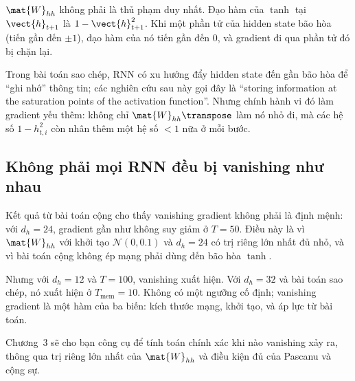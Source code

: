 $\mat{W}_{hh}$ không phải là thủ phạm duy nhất. Đạo hàm của $\tanh$ tại
$\vect{h}_{t+1}$ là $1 - \vect{h}_{t+1}^2$. Khi một phần tử của hidden
state bão hòa (tiến gần đến $\pm 1$), đạo hàm của nó tiến gần đến 0, và
gradient đi qua phần tử đó bị chặn lại.

Trong bài toán sao chép, RNN có xu hướng đẩy hidden state đến gần bão hòa
để ``ghi nhớ'' thông tin; các nghiên cứu sau này gọi đây là \enquote{storing
information at the saturation points of the activation function}. Nhưng chính
hành vi đó làm gradient yếu thêm: không chỉ $\mat{W}_{hh}\transpose$ làm nó
nhỏ đi, mà các hệ số $1 - h_{t,i}^2$ còn nhân thêm một hệ số $< 1$ nữa ở mỗi
bước.

\subsection{Không phải mọi RNN đều bị vanishing như nhau}

Kết quả từ bài toán cộng cho thấy vanishing gradient không phải là định mệnh:
với $d_h = 24$, gradient gần như không suy giảm ở $T = 50$. Điều này là vì
$\mat{W}_{hh}$ với khởi tạo $\mathcal{N}(0, 0.1)$ và $d_h = 24$ có trị riêng
lớn nhất đủ nhỏ, và vì bài toán cộng không ép mạng phải dùng đến bão hòa
$\tanh$.

Nhưng với $d_h = 12$ và $T = 100$, vanishing xuất hiện. Với $d_h = 32$ và
bài toán sao chép, nó xuất hiện ở $T_{\text{mem}} = 10$. Không có một ngưỡng
cố định; vanishing gradient là một hàm của ba biến: kích thước mạng, khởi
tạo, và áp lực từ bài toán.

Chương~3 sẽ cho bạn công cụ để tính toán chính xác khi nào vanishing xảy ra,
thông qua trị riêng lớn nhất của $\mat{W}_{hh}$ và điều kiện đủ của Pascanu
và cộng sự.

